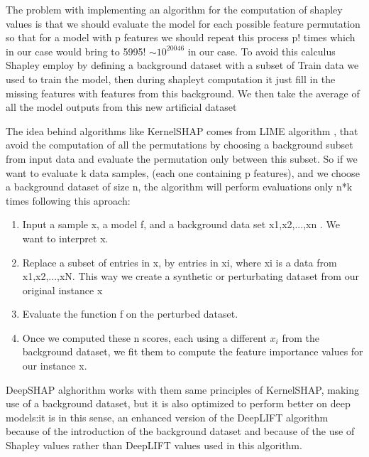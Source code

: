 \documentclass[a4paper,11pt]{article}
\begin{document}
The problem with implementing an algorithm for the computation of shapley values is that we should evaluate the model for each possible feature permutation so that for a model with p features we should repeat this process p! times which in our case would bring to 5995! $\sim 10^{20046}$ in our case.
To avoid this calculus Shapley employ by defining a background dataset with a subset of Train data we used to train the model, then during shapleyt computation it just fill in the missing features with features from this background.
We then take the average of all the model outputs from this new artificial dataset



The idea behind algorithms like KernelSHAP comes from LIME algorithm \cite{ribeiro-2016}, that avoid the computation of all the permutations by choosing a background subset from input data and evaluate the permutation only between this subset.
So if we want to evaluate k data samples, (each one containing p features), and we choose a background dataset of size n, the algorithm will perform evaluations only n*k times following this aproach:

\begin{enumerate}
\item Input a sample x, a model f, and a background data set {x1,x2,...,xn} . We want to interpret x.
\item Replace a subset of entries in x, by entries in xi, where xi is a data from {x1,x2,...,xN}. This way we create a synthetic or perturbating dataset from our original instance x
\item Evaluate the function f on the perturbed dataset.
\item Once we computed these n scores, each using a different $x_i$ from the background dataset, we fit them to compute the feature importance values for our instance x.
\end{enumerate}

DeepSHAP alghorithm works with them same principles of KernelSHAP, making use of a background dataset, but it is also optimized to perform better on deep models:it is in this sense, an enhanced version of the DeepLIFT algorithm because of the introduction of the background dataset and because of the use of Shapley values rather than DeepLIFT values used in this algorithm.
\end{document}
